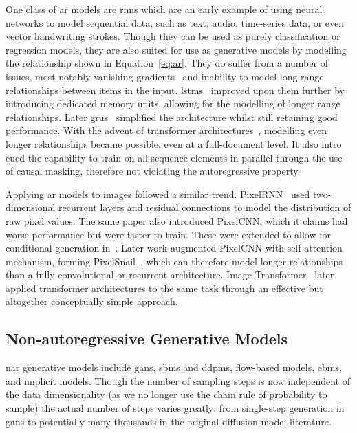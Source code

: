 One class of \gls{ar} models are \glspl{rnn} which are an early example of using
neural networks to model sequential data, such as text, audio, time-series data,
or even vector handwriting strokes. Though they can be used as purely
classification or regression models, they are also suited for use as generative
models by modelling the relationship shown in Equation~\ref{eq:ar}. They do
suffer from a number of issues, most notably vanishing
gradients~\cite{pascanu2012rnn} and inability to model long-range relationships
between items in the input. \Glspl{lstm}~\cite{hoch1997lstm} improved upon them
further by introducing dedicated memory units, allowing for the modelling of
longer range relationships. Later \glspl{gru}~\cite{cho2014gru} simplified the
architecture whilst still retaining good performance. With the advent of
transformer architectures~\cite{vaswani2017attention}, modelling even longer
relationships became possible, even at a full-document level. It also intro cued
the capability to train on all sequence elements in parallel through the use of
causal masking, therefore not violating the autoregressive property.

Applying \gls{ar} models to images followed a similar trend.
PixelRNN~\cite{oord2016pixelrnn} used two-dimensional recurrent layers and
residual connections to model the distribution of raw pixel values. The same
paper also introduced PixelCNN, which it claims had worse performance but were
faster to train. These were extended to allow for conditional generation
in~\cite{oord2016pixelcnn}. Later work augmented PixelCNN with self-attention
mechanism, forming PixelSnail~\cite{chen2017snail}, which can therefore model
longer relationships than a fully convolutional or recurrent architecture. Image
Transformer~\cite{parmar2018image} later applied transformer architectures to
the same task through an effective but altogether conceptually simple approach.

\subsection{Non-autoregressive Generative Models}
\label{subsec:nagm}
\Acrfull{nar} generative models include \glspl{gan}, \glspl{sbm} and
\glspl{ddpm}, flow-based models, \glspl{ebm}, and implicit models. Though the
number of sampling steps is now independent of the data dimensionality (as we no
longer use the chain rule of probability to sample) the actual number of steps
varies greatly: from single-step generation in \glspl{gan} to potentially many
thousands in the original diffusion model literature.

